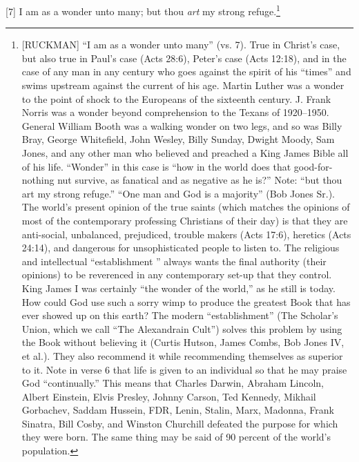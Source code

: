 [7] \textcolor[rgb]{0.00,0.00,1.00}{I am as a wonder unto many; but thou \emph{art} my strong refuge.}\footnote{[RUCKMAN] “I am as a wonder unto many” (vs. 7). True in Christ’s case, but also true in Paul’s case (Acts 28:6), Peter’s case (Acts 12:18), and in the case of any man in any century who goes against the spirit of his “times” and swims upstream against the current of his age. Martin Luther was a wonder to the point of shock to the Europeans of the sixteenth century. J. Frank Norris was a wonder beyond comprehension to the Texans of 1920--1950. General William Booth was a walking wonder on two legs, and so was Billy Bray, George Whitefield, John Wesley, Billy Sunday, Dwight Moody, Sam Jones, and any other man who believed and preached a King James Bible all of his life. “Wonder” in this case is “how in the world does that good-for-nothing nut survive, as fanatical and as negative as he is?” Note: “but thou art my strong refuge.” “One man and God is a majority” (Bob Jones Sr.). The world’s present opinion of the true saints (which matches the opinions of most of the contemporary professing Christians of their day) is that they are anti-social, unbalanced, prejudiced, trouble makers (Acts 17:6), heretics (Acts 24:14), and dangerous for unsophisticated people to listen to. The religious and intellectual “establishment ” always wants the final authority (their opinions) to be reverenced in any contemporary set-up that they control. King James I was certainly “the wonder of the world,” as he still is today. How could God use such a sorry wimp to produce the greatest Book that has ever showed up on this earth? The modern “establishment” (The Scholar’s Union, which we call “The Alexandrain Cult”) solves this problem by using the Book without believing it (Curtis Hutson, James Combs, Bob Jones IV, et al.). They also recommend it while recommending themselves as superior to it. Note in verse 6 that life is given to an individual so that he may praise God “continually.” This means that Charles Darwin, Abraham Lincoln, Albert Einstein, Elvis Presley, Johnny Carson, Ted Kennedy, Mikhail Gorbachev, Saddam Hussein, FDR, Lenin, Stalin, Marx, Madonna, Frank Sinatra, Bill Cosby, and Winston Churchill defeated the purpose for which they were born. The same thing may be said of 90 percent of the world’s population.\cite{Ruckman1992Psalms}}
